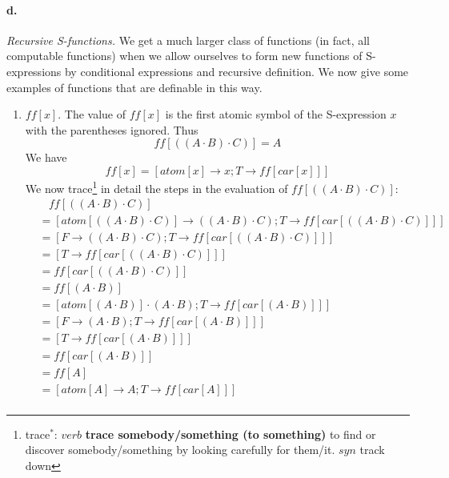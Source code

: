 \documentclass[11pt, a4paper]{article}
\begin{document}
\paragraph{d.}\textit{Recursive S-functions.}
We get a much larger class of functions (in fact, all computable functions) when
we allow ourselves to form new functions of S-expressions by conditional
expressions and recursive definition. We now give some examples of functions
that are definable in this way.
\begin{enumerate}
\item $ff[x]$. The value of $ff[x]$ is the first atomic symbol of the
  S-expression $x$ with the parentheses ignored. Thus
  $$ ff[((A \cdot B) \cdot C)] = A $$
  We have
  $$ ff[x] = [atom[x] \to x; T \to ff[car[x]]] $$
  We now
  trace\footnote{trace$^*$: $verb$ \textbf{trace somebody/something (to
      something)} to find or discover somebody/something by looking carefully
    for them/it. $syn$ track down}
  in detail the steps in the evaluation of $ff[((A \cdot B) \cdot
    C)]$:
  \begin{align*}
    &\ \ \ \ ff[((A \cdot B) \cdot C)]                                     \\
    &= [atom[((A \cdot B) \cdot C)] \to ((A \cdot B) \cdot C); T \to ff[car[((A
          \cdot B) \cdot C)]]]                                             \\
    &= [F \to ((A \cdot B) \cdot C); T \to ff[car[((A \cdot B) \cdot C)]]] \\
    &= [T \to ff[car[((A \cdot B) \cdot C)]]]                              \\
    &= ff[car[((A \cdot B) \cdot C)]]                                      \\
    &= ff[(A \cdot B)]                                                     \\
    &= [atom[(A \cdot B)] \cdot (A \cdot B); T \to ff[car[(A \cdot B)]]]   \\
    &= [F \to (A \cdot B); T \to ff[car[(A \cdot B)]]]                     \\
    &= [T \to ff[car[(A \cdot B)]]]                                        \\
    &= ff[car[(A \cdot B)]]                                                \\
    &= ff[A]                                                               \\
    &= [atom[A] \to A; T \to ff[car[A]]]                                   \\

\end{align*}
\end{enumerate}
\end{document}
